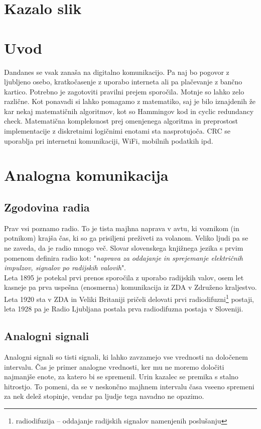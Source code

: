 \documentclass[12pt]{article}
\begin{document}
\vfill
\newpage
\tableofcontents

\begingroup
\makeatletter
\section*{Kazalo slik}
\let\clearpage\relax
\makeatother
\endgroup


\newpage
\section{Uvod}
Dandanes se vsak zanaša na digitalno komunikacijo. Pa naj bo pogovor z ljubljeno
osebo, kratkočasenje z uporabo interneta ali pa plačevanje z bančno kartico.
Potrebno je zagotoviti pravilni prejem sporočila. Motnje so lahko zelo različne.
Kot ponavadi si lahko pomagamo z matematiko, saj je bilo iznajdenih že kar nekaj
matematičnih algoritmov, kot so Hammingov kod in cyclic redundancy check.
Matematična kompleksnost prej omenjenega algoritma in preprostost
implementacije z diskretnimi logičnimi enotami sta nasprotujoča. CRC se
uporablja pri internetni komunikaciji, WiFi, mobilnih podatkih ipd.
\section{Analogna komunikacija}
    \subsection{Zgodovina radia}
        Prav vsi poznamo radio. To je tista majhna naprava v avtu, ki
        voznikom (in potnikom) krajša čas, ki so ga prisiljeni preživeti za
        volanom. Veliko ljudi pa se ne zaveda, da je radio mnogo več. Slovar
        slovenskega knjižnega jezika s prvim pomenom definira radio
        kot: "\textit{naprava za oddajanje in sprejemanje električnih
        impulzov, signalov po radijskih valovih}". \cite{SSKJ-radio}\\

        Leta 1895 \cite{ppt} je potekal prvi prenos sporočila z uporabo
        radijskih valov, osem let kasneje pa prva uspešna (enosmerna)
        komunikacija iz ZDA v Združeno kraljestvo. Leta 1920 sta v ZDA in
        Veliki Britaniji pričeli delovati prvi radiodifuzni\footnote{
        radiodifuzija – oddajanje radijskih signalov namenjenih poslušanju}
        postaji, leta 1928 pa je Radio Ljubljana postala prva radiodifuzna
        postaja v Sloveniji.
    \subsection{Analogni signali}
        Analogni signali so tisti signali, ki lahko zavzamejo vse vrednosti
        na določenem intervalu. Čas je primer analogne vrednosti, ker mu ne
        moremo določiti najmanjše enote, za katero bi se spremenil. Urin
        kazalec se premika s stalno hitrostjo. To pomeni, da se v neskončno
        majhnem intervalu časa vseeno spremeni za nek delež stopinje, vendar
        pa ljudje tega navadno ne opazimo.\\
\end{document}
